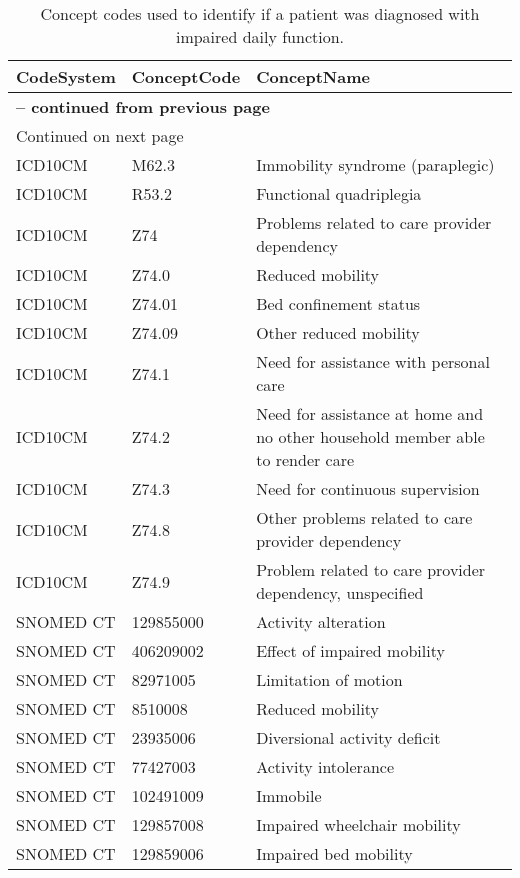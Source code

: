 \begin{longtable}{p{}p{}p{}}
\caption{Concept codes used to identify if a patient was diagnosed with impaired daily function.} \\ 
 CodeSystem & ConceptCode & ConceptName \\ 
  \hline 
\endfirsthead 
\multicolumn{3}{p{\textwidth}}{{ \bfseries \tablename \thetable{} -- continued from previous page}} \ 
\hline CodeSystem & ConceptCode & ConceptName \\ \hline 
\endhead 
\hline \multicolumn{3}{p{\textwidth}}{{Continued on next page}} \\ \hline 
\endfoot 
\hline 
\endlastfoot 
 \hline
ICD10CM & M62.3 & Immobility syndrome (paraplegic) \\ 
  ICD10CM & R53.2 & Functional quadriplegia \\ 
  ICD10CM & Z74 & Problems related to care provider dependency \\ 
  ICD10CM & Z74.0 & Reduced mobility \\ 
  ICD10CM & Z74.01 & Bed confinement status \\ 
  ICD10CM & Z74.09 & Other reduced mobility \\ 
  ICD10CM & Z74.1 & Need for assistance with personal care \\ 
  ICD10CM & Z74.2 & Need for assistance at home and no other household member able to render care \\ 
  ICD10CM & Z74.3 & Need for continuous supervision \\ 
  ICD10CM & Z74.8 & Other problems related to care provider dependency \\ 
  ICD10CM & Z74.9 & Problem related to care provider dependency, unspecified \\ 
  SNOMED CT & 129855000 & Activity alteration \\ 
  SNOMED CT & 406209002 & Effect of impaired mobility \\ 
  SNOMED CT & 82971005 & Limitation of motion \\ 
  SNOMED CT & 8510008 & Reduced mobility \\ 
  SNOMED CT & 23935006 & Diversional activity deficit \\ 
  SNOMED CT & 77427003 & Activity intolerance \\ 
  SNOMED CT & 102491009 & Immobile \\ 
  SNOMED CT & 129857008 & Impaired wheelchair mobility \\ 
  SNOMED CT & 129859006 & Impaired bed mobility \\ 

\end{longtable}
